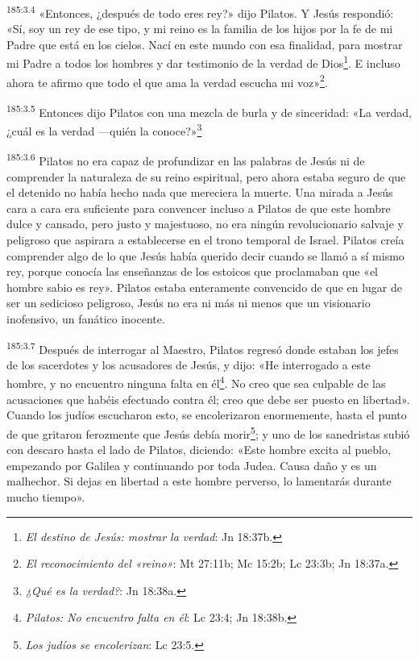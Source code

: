 \par
\textsuperscript{185:3.4} «Entonces, ¿después de todo eres rey?» dijo Pilatos. Y Jesús respondió: «Sí, soy un rey de ese tipo, y mi reino es la familia de los hijos por la fe de mi Padre que está en los cielos. Nací en este mundo con esa finalidad, para mostrar mi Padre a todos los hombres y dar testimonio de la verdad de Dios\footnote{\textit{El destino de Jesús: mostrar la verdad}: Jn 18:37b.}. E incluso ahora te afirmo que todo el que ama la verdad escucha mi voz»\footnote{\textit{El reconocimiento del «reino»}: Mt 27:11b; Mc 15:2b; Lc 23:3b; Jn 18:37a.}.

\par
\textsuperscript{185:3.5} Entonces dijo Pilatos con una mezcla de burla y de sinceridad: «La verdad, ¿cuál es la verdad ---quién la conoce?»\footnote{\textit{¿Qué es la verdad?}: Jn 18:38a.}

\par
\textsuperscript{185:3.6} Pilatos no era capaz de profundizar en las palabras de Jesús ni de comprender la naturaleza de su reino espiritual, pero ahora estaba seguro de que el detenido no había hecho nada que mereciera la muerte. Una mirada a Jesús cara a cara era suficiente para convencer incluso a Pilatos de que este hombre dulce y cansado, pero justo y majestuoso, no era ningún revolucionario salvaje y peligroso que aspirara a establecerse en el trono temporal de Israel. Pilatos creía comprender algo de lo que Jesús había querido decir cuando se llamó a sí mismo rey, porque conocía las enseñanzas de los estoicos que proclamaban que «el hombre sabio es rey». Pilatos estaba enteramente convencido de que en lugar de ser un sedicioso peligroso, Jesús no era ni más ni menos que un visionario inofensivo, un fanático inocente.

\par
\textsuperscript{185:3.7} Después de interrogar al Maestro, Pilatos regresó donde estaban los jefes de los sacerdotes y los acusadores de Jesús, y dijo: «He interrogado a este hombre, y no encuentro ninguna falta en él\footnote{\textit{Pilatos: No encuentro falta en él}: Lc 23:4; Jn 18:38b.}. No creo que sea culpable de las acusaciones que habéis efectuado contra él; creo que debe ser puesto en libertad». Cuando los judíos escucharon esto, se encolerizaron enormemente, hasta el punto de que gritaron ferozmente que Jesús debía morir\footnote{\textit{Los judíos se encolerizan}: Lc 23:5.}; y uno de los sanedristas subió con descaro hasta el lado de Pilatos, diciendo: «Este hombre excita al pueblo, empezando por Galilea y continuando por toda Judea. Causa daño y es un malhechor. Si dejas en libertad a este hombre perverso, lo lamentarás durante mucho tiempo».

